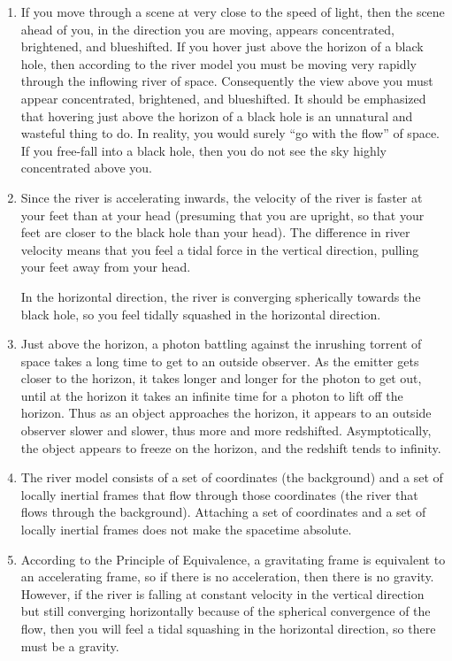 \documentclass[twocolumn,showpacs,preprintnumbers,amsmath,amssymb,prb]{revtex4}
\begin{document}
\begin{enumerate}
\item
If you move through a scene at very close to the speed of light,
then the scene ahead of you, in the direction you are moving,
appears concentrated, brightened, and blueshifted.
If you hover just above the horizon of a black hole,
then according to the river model you must be moving very rapidly
through the inflowing river of space.
Consequently the view above you must appear concentrated,
brightened, and blueshifted.
It should be emphasized that hovering just above the horizon
of a black hole is an unnatural and wasteful thing to do.
In reality, you would surely ``go with the flow'' of space.
If you free-fall into a black hole,
then you do not see the sky highly concentrated above you.

\item
Since the river is accelerating inwards,
the velocity of the river is faster at your feet than at your head
(presuming that you are upright,
so that your feet are closer to the black hole than your head).
The difference in river velocity
means that you feel a tidal force in the vertical direction,
pulling your feet away from your head.

In the horizontal direction,
the river is converging spherically towards the black hole,
so you feel tidally squashed in the horizontal direction.

\item
Just above the horizon, a photon battling against the inrushing
torrent of space takes a long time to get to an outside observer.
As the emitter gets closer to the horizon, it takes longer and
longer for the photon to get out,
until at the horizon it takes
an infinite time for a photon to lift off the horizon.
Thus as an object approaches the horizon,
it appears to an outside observer slower and slower,
thus more and more redshifted.
Asymptotically,
the object appears to freeze on the horizon,
and the redshift tends to infinity.

\item
The river model consists of a set of coordinates
(the background)
and a set of locally inertial frames that flow through those coordinates
(the river that flows through the background).
Attaching a set of coordinates and a set of locally inertial frames
does not make the spacetime absolute.

\item
According to the Principle of Equivalence,
a gravitating frame is equivalent to an accelerating frame,
so if there is no acceleration, then there is no gravity.
However,
if the river is falling at constant velocity in the vertical direction
but still converging horizontally because of the spherical convergence
of the flow,
then you will feel a tidal squashing in the horizontal direction,
so there must be a gravity.
\end{enumerate}
\end{document}
